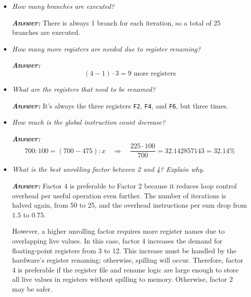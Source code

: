 \begin{itemize}
    \item \emph{How many branches are executed?}

    \textcolor{Green3}{\textbf{\emph{Answer:}}} There is always 1 branch for each iteration, so a total of 25 branches are executed.


    \item \emph{How many more registers are needed due to register renaming?}

    \textcolor{Green3}{\textbf{\emph{Answer:}}}
    \begin{equation*}
        \left(4 - 1\right) \cdot 3 = 9 \text{ more registers}
    \end{equation*}


    \item \emph{What are the registers that need to be renamed?}

    \textcolor{Green3}{\textbf{\emph{Answer:}}} It's always the three registers \texttt{F2}, \texttt{F4}, and \texttt{F6}, but three times.


    \item \emph{How much is the global instruction count decrease?}

    \textcolor{Green3}{\textbf{\emph{Answer:}}}
    \begin{equation*}
        700 : 100 = \left(700-475\right) : x \quad \Rightarrow \quad \dfrac{225 \cdot 100}{700} = 32.142857143 = 32.14 \%
    \end{equation*}


    \item \emph{What is the best unrolling factor between 2 and 4? Explain why.}

    \textcolor{Green3}{\textbf{\emph{Answer:}}} Factor 4 is preferable to Factor 2 because it reduces loop control overhead per useful operation even further. The number of iterations is halved again, from 50 to 25, and the overhead instructions per sum drop from $1.5$ to $0.75$.
    
    However, a higher unrolling factor requires more register names due to overlapping live values. In this case, factor 4 increases the demand for floating-point registers from 3 to 12. This increase must be handled by the hardware's register renaming; otherwise, spilling will occur. Therefore, factor 4 is preferable if the register file and rename logic are large enough to store all live values in registers without spilling to memory. Otherwise, factor 2 may be safer.
\end{itemize}

